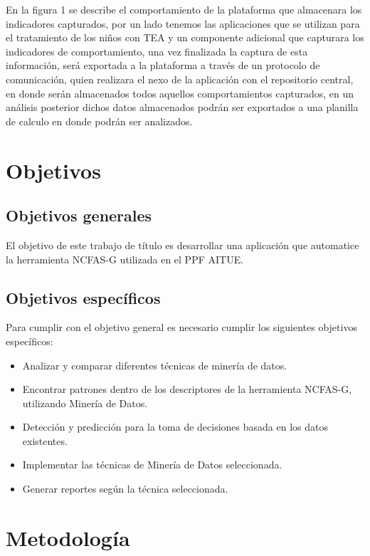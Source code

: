 \documentclass[12pt,letterpaper]{article}
\begin{document}
En la figura 1 se describe el comportamiento de la plataforma que almacenara los 
indicadores capturados,  por un lado tenemos las aplicaciones que se utilizan para 
el tratamiento de los ni\~nos con TEA y un componente adicional que capturara los 
indicadores de comportamiento, una vez finalizada la captura de esta informaci\'on, 
ser\'a exportada a la plataforma a trav\'es de un protocolo de comunicaci\'on, quien 
realizara el nexo de la aplicaci\'on con el repositorio central, en donde ser\'an 
almacenados todos aquellos comportamientos capturados, en un an\'alisis 
posterior dichos datos almacenados podr\'an ser exportados a una planilla de
 calculo en donde podr\'an ser analizados. 

\section{Objetivos}
\label{obj}

\subsection{Objetivos generales}
El objetivo de este trabajo de título es desarrollar una aplicación que automatice la herramienta NCFAS-G utilizada en el PPF AITUE. 


\subsection{Objetivos espec\'ificos}

Para cumplir con el objetivo general es necesario cumplir los siguientes objetivos específicos:
\begin{itemize}

\item Analizar y comparar diferentes técnicas de minería de datos.
\item	Encontrar patrones dentro de los descriptores de la herramienta NCFAS-G, utilizando Minería de Datos. 
\item	Detección y predicción para la toma de decisiones basada en los datos existentes. 
\item	Implementar las técnicas de Minería de Datos seleccionada. 
\item	Generar reportes según la técnica seleccionada. 

\end{itemize}




\section{Metodolog\'ia}
\label{metod}
\end{document}
